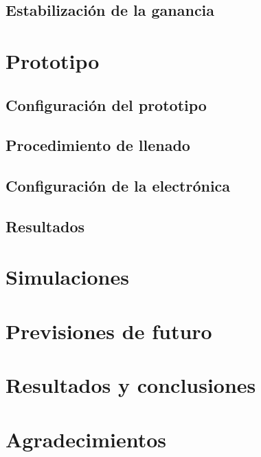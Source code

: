 \documentclass[11pt,a4paper]{article}
\begin{document}
	\subsection{Estabilización de la ganancia}\label{sec:Compensacion}
	

\section{Prototipo} \label{sec:Prototipo}

	\subsection{Configuración del prototipo}\label{sec:Configuracion}
	
	
	\subsection{Procedimiento de llenado}\label{sec:Llenado}
	
	
	\subsection{Configuración de la electrónica}\label{sec:Electronica}
	
	
	\subsection{Resultados}\label{sec:Resultados}
	

\section{Simulaciones} \label{sec:Simulaciones}


\section{Previsiones de futuro} \label{sec:Futuro}


\section{Resultados y conclusiones} \label{sec:Conclusiones}


\section*{Agradecimientos} \label{sec:Agradecimientos}



\end{document}
